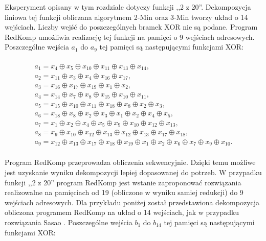 Eksperyment opisany w tym rozdziale dotyczy funkcji ,,2 z 20''.
Dekompozycja liniowa tej funkcji obliczana algorytmem 2-Min oraz 3-Min \cite{sasao-s-min} tworzy układ o 14 wejściach.
Liczby wejść do poszczególnych bramek XOR nie są podane.
Program RedKomp umożliwia realizację tej funkcji na pamięci o 9 wejściach adresowych.
Poszczególne wejścia $a_1$ do $a_9$ tej pamięci są następującymi funkcjami XOR:

\begin{multline} \\
a_1 = x_{4} \oplus x_{5} \oplus x_{10} \oplus x_{11} \oplus x_{13} \oplus x_{14}, \\
a_2 = x_{11} \oplus x_{3} \oplus x_{4} \oplus x_{16} \oplus x_{17}, \\
a_3 = x_{16} \oplus x_{17} \oplus x_{19} \oplus x_{1} \oplus x_{2}, \\
a_4 = x_{14} \oplus x_{7} \oplus x_{8} \oplus x_{15} \oplus x_{10} \oplus x_{11}, \\
a_5 = x_{15} \oplus x_{10} \oplus x_{11} \oplus x_{18} \oplus x_{8} \oplus x_{2} \oplus x_{3}, \\
a_6 = x_{18} \oplus x_{8} \oplus x_{2} \oplus x_{3} \oplus x_{1} \oplus x_{2} \oplus x_{4} \oplus x_{5}, \\
a_7 = x_{1} \oplus x_{2} \oplus x_{4} \oplus x_{5} \oplus x_{9} \oplus x_{10} \oplus x_{12} \oplus x_{13}, \\
a_8 = x_{9} \oplus x_{10} \oplus x_{12} \oplus x_{13} \oplus x_{12} \oplus x_{13} \oplus x_{17} \oplus x_{18}, \\
a_9 = x_{12} \oplus x_{13} \oplus x_{17} \oplus x_{18} \oplus x_{19} \oplus x_{1} \oplus x_{2} \oplus x_{6} \oplus x_{7} \oplus x_{9} \oplus x_{10}. \\
\end{multline}

Program RedKomp przeprowadza obliczenia sekwencyjnie.
Dzięki temu możliwe jest uzyskanie wyniku dekompozycji lepiej dopasowanej do potrzeb.
W przypadku funkcji ,,2 z 20''
program RedKomp jest wstanie zaproponować rozwiązania realizowalne na pamięciach
od 19 (obliczone w wyniku samiej redukcji) do 9 wejściach adresowych.
Dla przykładu poniżej został przedstawiona dekompozycja obliczona programem RedKomp na układ o 14 wejściach,
jak w przypadku rozwiązania Sasao \cite{sasao-s-min}.
Poszczególne wejścia $b_1$ do $b_{14}$ tej pamięci są następującymi funkcjami XOR:

